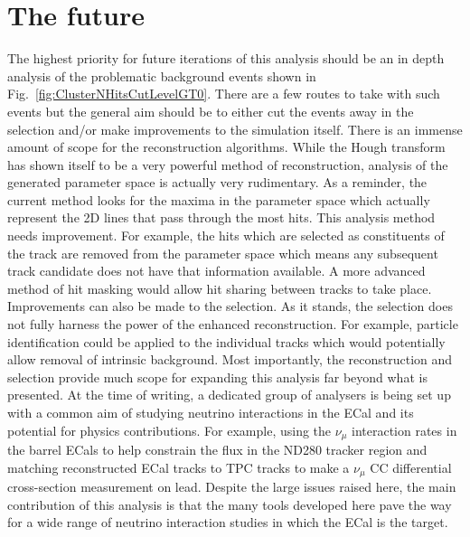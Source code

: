 \section{The future}
\label{sec:TheFuture}
The highest priority for future iterations of this analysis should be an in depth analysis of the problematic background events shown in Fig.~\ref{fig:ClusterNHitsCutLevelGT0}.  There are a few routes to take with such events but the general aim should be to either cut the events away in the selection and/or make improvements to the simulation itself.
\newline
\newline
There is an immense amount of scope for the reconstruction algorithms.  While the Hough transform has shown itself to be a very powerful method of reconstruction, analysis of the generated parameter space is actually very rudimentary.  As a reminder, the current method looks for the maxima in the parameter space which actually represent the 2D lines that pass through the most hits.  This analysis method needs improvement.  For example, the hits which are selected as constituents of the track are removed from the parameter space which means any subsequent track candidate does not have that information available.  A more advanced method of hit masking would allow hit sharing between tracks to take place.  
\newline
\newline
Improvements can also be made to the selection.  As it stands, the selection does not fully harness the power of the enhanced reconstruction.  For example, particle identification could be applied to the individual tracks which would potentially allow removal of intrinsic background.
\newline
\newline
Most importantly, the reconstruction and selection provide much scope for expanding this analysis far beyond what is presented.  At the time of writing, a dedicated group of analysers is being set up with a common aim of studying neutrino interactions in the ECal and its potential for physics contributions.  For example, using the $\nu_\mu$ interaction rates in the barrel ECals to help constrain the flux in the ND280 tracker region and matching reconstructed ECal tracks to TPC tracks to make a $\nu_\mu$ CC differential cross-section measurement on lead.
\newline
\newline
Despite the large issues raised here, the main contribution of this analysis is that the many tools developed here pave the way for a wide range of neutrino interaction studies in which the ECal is the target.







